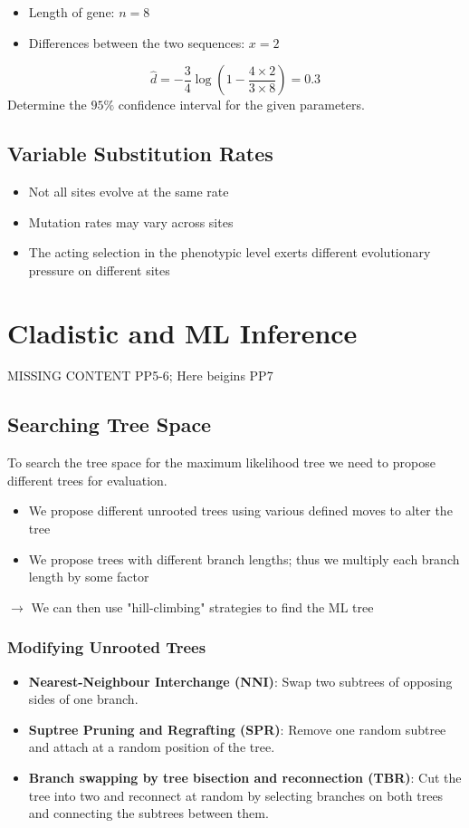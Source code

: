 \documentclass{article}
\begin{document}
\begin{multicols*}{3}
\begin{itemize}
    \item Length of gene: $n = 8$
    \item Differences between the two sequences: $x = 2$
\end{itemize}

$$\hat{d} = -\frac{3}{4}\log\left(1-\frac{4\times 2}{3\times 8}\right) = 0.3$$
Determine the $95 \%$ confidence interval for the given parameters. 

\subsection{Variable Substitution Rates}

\begin{itemize}
    \item Not all sites evolve at the same rate
    \item Mutation rates may vary across sites \item The acting selection in the phenotypic level exerts different evolutionary pressure on different sites
\end{itemize}

\section{Cladistic and ML Inference}
{\color{red} MISSING CONTENT PP5-6; Here beigins PP7}

\subsection{Searching Tree Space}
To search the tree space for the maximum likelihood tree we need to propose different trees for evaluation. 
\begin{itemize}
    \item We propose different unrooted trees using various defined moves to alter the tree
    \item We propose trees with different branch lengths; thus we multiply each branch length by some factor
\end{itemize}
$\rightarrow$ We can then use "hill-climbing" strategies to find the ML tree

\subsubsection{Modifying Unrooted Trees}

\begin{itemize}
    \item \textbf{Nearest-Neighbour Interchange (NNI)}: Swap two subtrees of opposing sides of one branch. 
    \item \textbf{Suptree Pruning and Regrafting (SPR)}: Remove one random subtree and attach at a random position of the tree.
    \item \textbf{Branch swapping by tree bisection and reconnection (TBR)}: Cut the tree into two and reconnect at random by selecting branches on both trees and connecting the subtrees between them. 
\end{itemize}


\end{multicols*}
\end{document}
